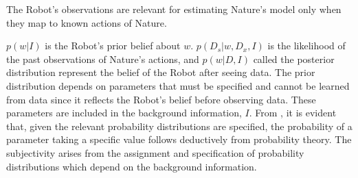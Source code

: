 \begin{axiom}
	\label{ax:observation_relevance}
	The Robot's observations are relevant for estimating Nature's model only when they map to known actions of Nature.
\end{axiom}

$p(w|I)$ is the Robot's prior belief about $w$. $p(D_s|w,D_x,I)$ is the likelihood of the past observations of Nature's actions, and $p(w|D,I)$ called the posterior distribution represent the belief of the Robot after seeing data. The prior distribution depends on parameters that must be specified and cannot be learned from data since it reflects the Robot's belief before observing data. These parameters are included in the background information, $I$. From , it is evident that, given the relevant probability distributions are specified, the probability of a parameter taking a specific value follows deductively from probability theory. The subjectivity arises from the assignment and specification of probability distributions which depend on the background information.



